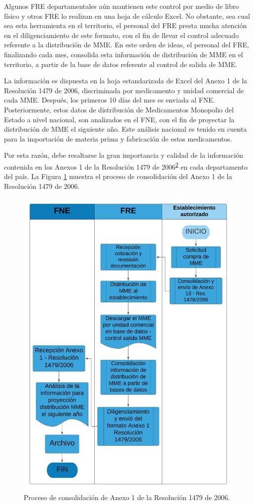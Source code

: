 \documentclass[
]{book}
\begin{document}
Algunos FRE departamentales aún mantienen este control por medio de libro físico y otros FRE lo realizan en una hoja de cálculo Excel. No obstante, sea cual sea esta herramienta en el territorio, el personal del FRE presta mucha atención en el diligenciamiento de este formato, con el fin de llevar el control adecuado referente a la distribución de MME. En este orden de ideas, el personal del FRE, finalizando cada mes, consolida esta información de distribución de MME en el territorio, a partir de la base de datos referente al control de salida de MME.

La información es dispuesta en la hoja estandarizada de Excel del Anexo 1 de la Resolución 1479 de 2006, discriminada por medicamento y unidad comercial de cada MME. Después, los primeros 10 días del mes es enviada al FNE. Posteriormente, estos datos de distribución de Medicamentos Monopolio del Estado a nivel nacional, son analizados en el FNE, con el fin de proyectar la distribución de MME el siguiente año. Este análisis nacional es tenido en cuenta para la importación de materia prima y fabricación de estos medicamentos.

Por esta razón, debe resaltarse la gran importancia y calidad de la información contenida en los Anexos 1 de la Resolución 1479 de 2006\textsuperscript{\protect\hyperlink{ref-MSPS1479-2006}{2}} en cada departamento del país. La Figura \ref{fig:procesoA1-1479} muestra el proceso de consolidación del Anexo 1 de la Resolución 1479 de 2006.

\begin{figure}

{\centering \includegraphics[width=0.8\linewidth]{figures/Consolidacion_A1_Res_1479_2006} 

}

\caption{Proceso de consolidación de Anexo 1 de la Resolución 1479 de 2006.}\label{fig:procesoA1-1479}
\end{figure}
\end{document}
